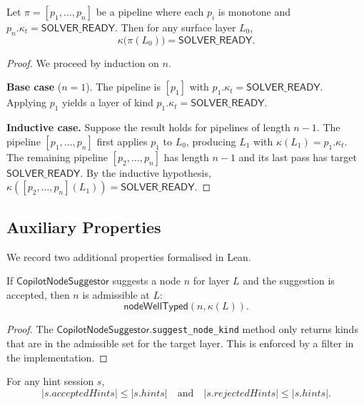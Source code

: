 \documentclass[11pt]{article}
\newcommand{\CNS}{\mathsf{CopilotNodeSuggestor}}
\newcommand{\SolverReady}{\mathsf{SOLVER\_READY}}
\begin{document}
\begin{theorem}\label{thm:lower-correct}
Let $\pi = [p_1, \dots, p_n]$ be a pipeline where each $p_i$ is
monotone and $p_n.\kappa_t = \SolverReady$.  Then for any surface
layer $L_0$,
\[
  \kappa\bigl(\pi(L_0)\bigr) = \SolverReady.
\]
\end{theorem}

\begin{proof}
We proceed by induction on $n$.

\textbf{Base case} ($n = 1$).  The pipeline is $[p_1]$ with
$p_1.\kappa_t = \SolverReady$.  Applying $p_1$ yields a layer of kind
$p_1.\kappa_t = \SolverReady$.

\textbf{Inductive case.}  Suppose the result holds for pipelines of
length $n - 1$.  The pipeline $[p_1, \dots, p_n]$ first applies $p_1$
to $L_0$, producing $L_1$ with $\kappa(L_1) = p_1.\kappa_t$.  The
remaining pipeline $[p_2, \dots, p_n]$ has length $n - 1$ and its last
pass has target $\SolverReady$.  By the inductive hypothesis,
$\kappa([p_2, \dots, p_n](L_1)) = \SolverReady$.
\end{proof}

\subsection{Auxiliary Properties}\label{sec:aux-formal}

We record two additional properties formalised in Lean.

\begin{proposition}\label{prop:node-wt}
If $\CNS$ suggests a node $n$ for layer $L$ and the suggestion is
accepted, then $n$ is admissible at $L$:
\[
  \mathsf{nodeWellTyped}(n, \kappa(L)).
\]
\end{proposition}

\begin{proof}
The $\CNS$.\texttt{suggest\_node\_kind} method only returns kinds that
are in the admissible set for the target layer.  This is enforced by a
filter in the implementation.
\end{proof}

\begin{proposition}\label{prop:acc-subset}
For any hint session $s$,
\[
  |s.\mathit{acceptedHints}| \le |s.\mathit{hints}|
  \quad\text{and}\quad
  |s.\mathit{rejectedHints}| \le |s.\mathit{hints}|.
\]
\end{proposition}
\end{document}
